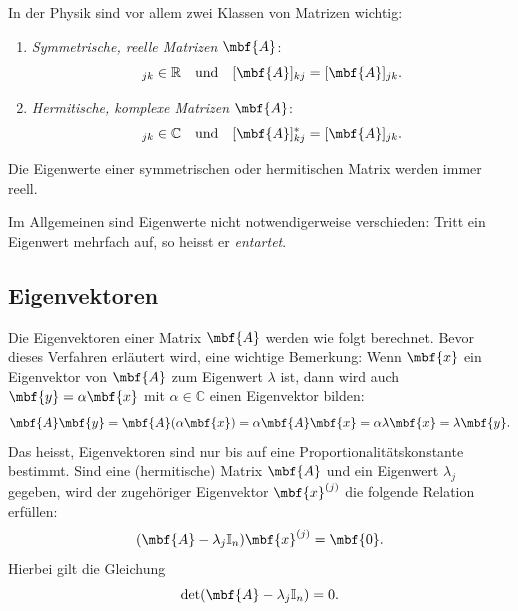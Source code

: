In der Physik sind vor allem zwei Klassen von Matrizen wichtig:
\begin{enumerate}
  \item \emph{Symmetrische, reelle Matrizen} $\mbf{A}$:
    \begin{equation}
      [\mbf{A}]_{jk} \in \mathbb{R}\quad \text{und}\quad [\mbf{A}]_{kj} = [\mbf{A}]_{jk}.
    \end{equation}
  \item \emph{Hermitische, komplexe Matrizen} $\mbf{A}$:
    \begin{equation}
      [\mbf{A}]_{jk} \in \mathbb{C}\quad \text{und}\quad [\mbf{A}]_{kj}^* = [\mbf{A}]_{jk}.
    \end{equation}
\end{enumerate}
Die Eigenwerte einer symmetrischen oder hermitischen Matrix werden immer reell.

Im Allgemeinen sind Eigenwerte nicht notwendigerweise verschieden: Tritt ein Eigenwert mehrfach auf, so heisst er \emph{entartet}.

\subsection{Eigenvektoren}
Die Eigenvektoren einer Matrix $\mbf{A}$ werden wie folgt berechnet. Bevor dieses Verfahren erläutert wird, eine wichtige Bemerkung: Wenn $\mbf{x}$ ein Eigenvektor von $\mbf{A}$ zum Eigenwert $\lambda$ ist, dann wird auch $\mbf{y} = \alpha\mbf{x}$ mit $\alpha\in \mathbb{C}$ einen Eigenvektor bilden:
\begin{equation}
  \mbf{A}\mbf{y} = \mbf{A}(\alpha \mbf{x}) = \alpha\mbf{A}\mbf{x} = \alpha\lambda\mbf{x} = \lambda \mbf{y}.   
\end{equation}  
Das heisst, Eigenvektoren sind nur bis auf eine Proportionalitätskonstante bestimmt. Sind eine (hermitische) Matrix $\mbf{A}$ und ein Eigenwert $\lambda_j$ gegeben, wird der zugehöriger Eigenvektor $\mbf{x}^{(j)}$ die folgende Relation erfüllen:
\begin{equation}
  (\mbf{A}-\lambda_j \mathbb{I}_n)\mbf{x}^{(j)} = \mbf{0}.
\end{equation}
Hierbei gilt die Gleichung
\begin{equation}
  \det(\mbf{A}-\lambda_j\mathbb{I}_n) = 0.
\end{equation}

